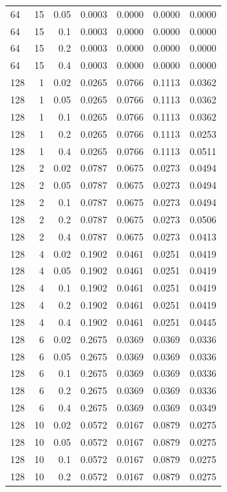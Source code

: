 \begin{table}[t]
\begin{tabular}{lrrrrrr}
64 & 15 & 0.05 & 0.0003 & 0.0000 & 0.0000 & 0.0000 \\
64 & 15 & 0.1 & 0.0003 & 0.0000 & 0.0000 & 0.0000 \\
64 & 15 & 0.2 & 0.0003 & 0.0000 & 0.0000 & 0.0000 \\
64 & 15 & 0.4 & 0.0003 & 0.0000 & 0.0000 & 0.0000 \\
128 & 1 & 0.02 & 0.0265 & 0.0766 & 0.1113 & 0.0362 \\
128 & 1 & 0.05 & 0.0265 & 0.0766 & 0.1113 & 0.0362 \\
128 & 1 & 0.1 & 0.0265 & 0.0766 & 0.1113 & 0.0362 \\
128 & 1 & 0.2 & 0.0265 & 0.0766 & 0.1113 & 0.0253 \\
128 & 1 & 0.4 & 0.0265 & 0.0766 & 0.1113 & 0.0511 \\
128 & 2 & 0.02 & 0.0787 & 0.0675 & 0.0273 & 0.0494 \\
128 & 2 & 0.05 & 0.0787 & 0.0675 & 0.0273 & 0.0494 \\
128 & 2 & 0.1 & 0.0787 & 0.0675 & 0.0273 & 0.0494 \\
128 & 2 & 0.2 & 0.0787 & 0.0675 & 0.0273 & 0.0506 \\
128 & 2 & 0.4 & 0.0787 & 0.0675 & 0.0273 & 0.0413 \\
128 & 4 & 0.02 & 0.1902 & 0.0461 & 0.0251 & 0.0419 \\
128 & 4 & 0.05 & 0.1902 & 0.0461 & 0.0251 & 0.0419 \\
128 & 4 & 0.1 & 0.1902 & 0.0461 & 0.0251 & 0.0419 \\
128 & 4 & 0.2 & 0.1902 & 0.0461 & 0.0251 & 0.0419 \\
128 & 4 & 0.4 & 0.1902 & 0.0461 & 0.0251 & 0.0445 \\
128 & 6 & 0.02 & 0.2675 & 0.0369 & 0.0369 & 0.0336 \\
128 & 6 & 0.05 & 0.2675 & 0.0369 & 0.0369 & 0.0336 \\
128 & 6 & 0.1 & 0.2675 & 0.0369 & 0.0369 & 0.0336 \\
128 & 6 & 0.2 & 0.2675 & 0.0369 & 0.0369 & 0.0336 \\
128 & 6 & 0.4 & 0.2675 & 0.0369 & 0.0369 & 0.0349 \\
128 & 10 & 0.02 & 0.0572 & 0.0167 & 0.0879 & 0.0275 \\
128 & 10 & 0.05 & 0.0572 & 0.0167 & 0.0879 & 0.0275 \\
128 & 10 & 0.1 & 0.0572 & 0.0167 & 0.0879 & 0.0275 \\
128 & 10 & 0.2 & 0.0572 & 0.0167 & 0.0879 & 0.0275 \\

\end{tabular}
\end{table}
